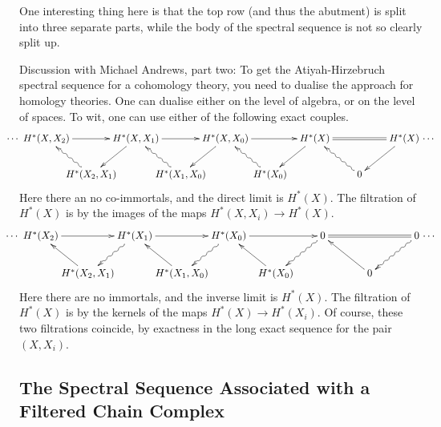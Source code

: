 \documentclass[11pt]{article}
\newcommand{\myheading}[1]
{{\noindent\Large #1}

}
\renewcommand{\myheading}[1]{\subsection{#1}}
\begin{document}
\begin{discussion of EHP SS}
One interesting thing here is that the top row (and thus the abutment) is split
into three separate parts, while the body of the spectral sequence is not so
clearly split up.

{\color{red}Discussion with Michael Andrews, part two:}
To get the Atiyah-Hirzebruch spectral sequence for a cohomology theory, you need
to dualise the approach for homology theories. One can dualise either on the
level of algebra, or on the level of spaces. To wit, one can use either of the
following exact couples.
\[\xymatrix@!0@C=1.6cm@R=1.28cm{%
\makebox[0cm][r]{$\cdots$\
}H^*(X,X_2)\ar[rr]&&H^*(X,X_1) \ar[rr]\ar[ld]&&H^*(X,X_0)\ar[rr]
\ar[ld]&&H^*(X)\ar[ld]
\ar@{=}[rr]&&H^*(X)\makebox[0cm][l]{\ $\cdots$}\ar[ld]\\
&H^*(X_2,X_1)\ar@{~>}[ul]&&
H^*(X_1,X_0)\ar@{~>}[lu]&&
H^*(X_0)\ar@{~>}[lu]&&
0\ar@{~>}[lu]
}\]
Here there an no co-immortals, and the direct limit is $H^*(X)$. The filtration
of $H^*(X)$ is by the images of the maps $H^*(X,X_i)\to H^*(X)$.
\[\xymatrix@!0@C=1.6cm@R=1.28cm{%
\makebox[0cm][r]{$\cdots$\ }
H^*(X_2)\ar[rr]&&
H^*(X_1)\ar[rr]\ar@{~>}[ld]&&
H^*(X_0)\ar[rr] \ar@{~>}[ld]&&\ar@{~>}[ld]
0\ar@{=}[rr]&&
0\makebox[0cm][l]{\ $\cdots$}\ar@{~>}[ld]\\
&H^*(X_2,X_1)\ar[ul]&&
H^*(X_1,X_0)\ar[lu]&&
H^*(X_0)\ar[lu]&&
0\ar[lu]
}\]
Here there are no immortals, and the inverse limit is $H^*(X)$. The filtration
of $H^*(X)$ is by the kernels of the maps $H^*(X)\to H^*(X_i)$. Of course, these
two filtrations coincide, by exactness in the long exact sequence for the pair
$(X,X_i)$.
\end{discussion of EHP SS}
\myheading{The Spectral Sequence Associated with a Filtered Chain Complex}
\end{document}
